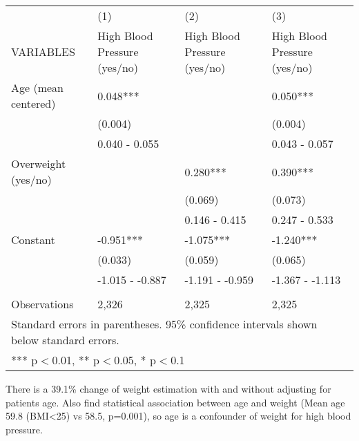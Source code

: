 \documentclass{article}
\begin{document}
\begin{table}[h!]
    \centering
    \begin{tabular}{l*{3}{p{.2\linewidth}}} \toprule
 & (1) & (2) & (3) \\
VARIABLES & High Blood Pressure (yes/no) & High Blood Pressure (yes/no) & High Blood Pressure (yes/no) \\ \midrule
Age (mean centered) & 0.048*** &  & 0.050*** \\
 & (0.004) &  & (0.004) \\
 & 0.040 - 0.055 &  & 0.043 - 0.057 \\
Overweight (yes/no) &  & 0.280*** & 0.390*** \\
 &  & (0.069) & (0.073) \\
 &  & 0.146 - 0.415 & 0.247 - 0.533 \\
Constant & -0.951*** & -1.075*** & -1.240*** \\
 & (0.033) & (0.059) & (0.065) \\
 & -1.015 - -0.887 & -1.191 - -0.959 & -1.367 - -1.113 \\
 &  &  &  \\
 Observations & 2,326 & 2,325 & 2,325 \\ \hline
\multicolumn{4}{p{.9\linewidth}}{ Standard errors in parentheses. 95\% confidence intervals shown below standard errors.} \\
\multicolumn{4}{l}{ *** p$<$0.01, ** p$<$0.05, * p$<$0.1} \\
\end{tabular}


\end{table}

There is a 39.1\% change of weight estimation with and without adjusting for patients age. Also find statistical association between age and weight (Mean age 59.8 (BMI<25) vs 58.5, p=0.001), so age is a confounder of weight for high blood pressure.
\end{document}
